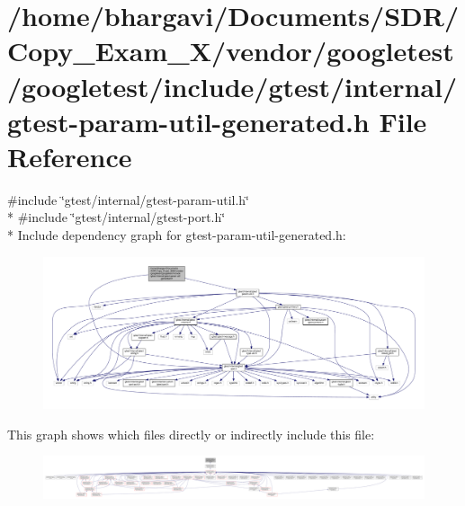\hypertarget{gtest-param-util-generated_8h}{}\section{/home/bhargavi/\+Documents/\+S\+D\+R/\+Copy\+\_\+\+Exam\+\_\+X/vendor/googletest/googletest/include/gtest/internal/gtest-\/param-\/util-\/generated.h File Reference}
\label{gtest-param-util-generated_8h}
{\ttfamily \#include \char`\"{}gtest/internal/gtest-\/param-\/util.\+h\char`\"{}}\\*
{\ttfamily \#include \char`\"{}gtest/internal/gtest-\/port.\+h\char`\"{}}\\*
Include dependency graph for gtest-\/param-\/util-\/generated.h\+:
\nopagebreak
\begin{figure}[H]
\begin{center}
\leavevmode
\includegraphics[width=350pt]{gtest-param-util-generated_8h__incl}
\end{center}
\end{figure}
This graph shows which files directly or indirectly include this file\+:
\nopagebreak
\begin{figure}[H]
\begin{center}
\leavevmode
\includegraphics[width=350pt]{gtest-param-util-generated_8h__dep__incl}
\end{center}
\end{figure}
